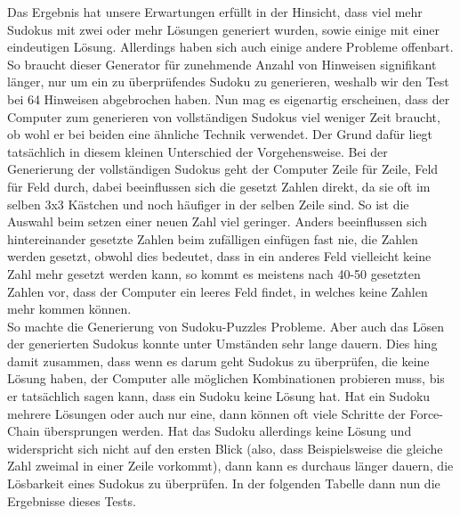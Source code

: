 \documentclass[11pt,a4paper]{article}
\begin{document}
Das Ergebnis hat unsere Erwartungen erfüllt in der Hinsicht, dass viel mehr Sudokus mit zwei oder mehr Lösungen generiert wurden, sowie einige mit einer eindeutigen Lösung. Allerdings haben sich auch einige andere Probleme offenbart. So braucht dieser Generator für zunehmende Anzahl von Hinweisen signifikant länger, nur um ein zu überprüfendes Sudoku zu generieren, weshalb wir den Test bei 64 Hinweisen abgebrochen haben. Nun mag es eigenartig erscheinen, dass der Computer zum generieren von vollständigen Sudokus viel weniger Zeit braucht, ob wohl er bei beiden eine ähnliche Technik verwendet. Der Grund dafür liegt tatsächlich in diesem kleinen Unterschied der Vorgehensweise. Bei der Generierung der vollständigen Sudokus geht der Computer Zeile für Zeile, Feld für Feld durch, dabei beeinflussen sich die gesetzt Zahlen direkt, da sie oft im selben 3x3 Kästchen und noch häufiger in der selben Zeile sind. So ist die Auswahl beim setzen einer neuen Zahl viel geringer. Anders beeinflussen sich hintereinander gesetzte Zahlen beim zufälligen einfügen fast nie, die Zahlen werden gesetzt, obwohl dies bedeutet, dass in ein anderes Feld vielleicht keine Zahl mehr gesetzt werden kann, so kommt es meistens nach 40-50 gesetzten Zahlen vor, dass der Computer ein leeres Feld findet, in welches keine Zahlen mehr kommen können.\\
So machte die Generierung von Sudoku-Puzzles Probleme. Aber auch das Lösen der generierten Sudokus konnte unter Umständen sehr lange dauern. Dies hing damit zusammen, dass wenn es darum geht Sudokus zu überprüfen, die keine Lösung haben, der Computer alle möglichen Kombinationen probieren muss, bis er tatsächlich sagen kann, dass ein Sudoku keine Lösung hat. Hat ein Sudoku mehrere Lösungen oder auch nur eine, dann können oft viele Schritte der Force-Chain übersprungen werden. Hat das Sudoku allerdings keine Lösung und widerspricht sich nicht auf den ersten Blick (also, dass Beispielsweise die gleiche Zahl zweimal in einer Zeile vorkommt), dann kann es durchaus länger dauern, die Lösbarkeit eines Sudokus zu überprüfen. In der folgenden Tabelle dann nun die Ergebnisse dieses Tests.
\ \\       
\end{document}
